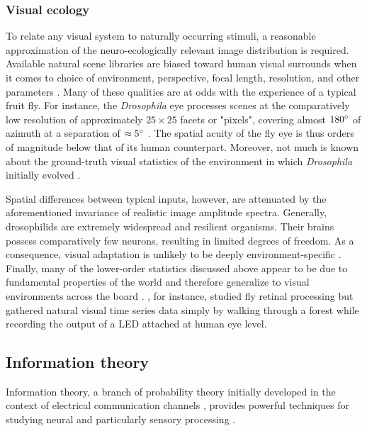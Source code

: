 \subsubsection{Visual ecology}
To relate any visual system to naturally occurring stimuli, a reasonable approximation of the neuro-ecologically relevant image distribution is required. Available natural scene libraries are biased toward human visual surrounds when it comes to choice of environment, perspective, focal length, resolution, and other parameters \citep{Tkacik:2011aa}. Many of these qualities are at odds with the experience of a typical fruit fly. For instance, the \textit{Drosophila} eye processes scenes at the comparatively low resolution of approximately $25 \times 25$ facets or "pixels", covering almost $180\degree$ of azimuth at a separation of $\approx5\degree$ \citep{Borst:2009gv}. The spatial acuity of the fly eye is thus orders of magnitude below that of its human counterpart. Moreover, not much is known about the ground-truth visual statistics of the environment in which \textit{Drosophila} initially evolved \citep{Dickinson:2014aa}.

Spatial differences between typical inputs, however, are attenuated by the aforementioned invariance of realistic image amplitude spectra. Generally, drosophilids are extremely widespread and resilient organisms. Their brains possess comparatively few neurons, resulting in limited degrees of freedom. As a consequence, visual adaptation is unlikely to be deeply environment-specific \citep{Dickinson:2014aa}. Finally, many of the lower-order statistics discussed above appear to be due to fundamental properties of the world and therefore generalize to visual environments across the board \citep{Geisler:2008gu,Simoncelli:2001dn}. \citet{vanHateren:1997vg}, for instance, studied fly retinal processing but gathered natural visual time series data simply by walking through a forest while recording the output of a LED attached at human eye level.

\subsection{Information theory}


Information theory, a branch of probability theory initially developed in the context of electrical communication channels \citep{Shannon:1948aa}, provides powerful techniques for studying neural and particularly sensory processing \citep{Borst:1999hw}.

